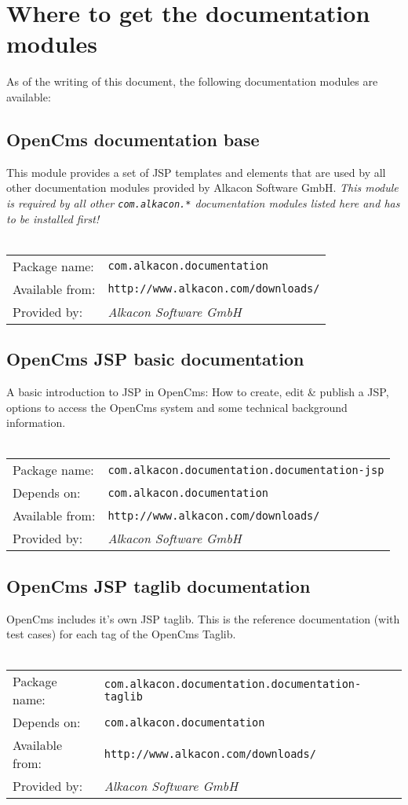 \section{Where to get the documentation modules}

As of the writing of this document, the following documentation modules are available:

\subsection{OpenCms documentation base}
This module provides a set of JSP templates and elements that are used by
all other documentation modules provided by Alkacon Software GmbH. {\em This module is required
by all other {\tt com.alkacon.*} documentation modules listed here and has to be installed first!}
\\
\\
\begin{tabular}{ll}
Package name: & {\tt com.alkacon.documentation}\\
Available from: & {\tt http://www.alkacon.com/downloads/}\\
Provided by: & {\em Alkacon Software GmbH}\\
\end{tabular}

\subsection{OpenCms JSP basic documentation}
A basic introduction to JSP in OpenCms: How to create, edit \& publish a JSP, options to access 
the OpenCms system and some technical background information.
\\
\\
\begin{tabular}{ll}
Package name: & {\tt com.alkacon.documentation.documentation-jsp}\\
Depends on: & {\tt com.alkacon.documentation}\\
Available from: & {\tt http://www.alkacon.com/downloads/}\\
Provided by: & {\em Alkacon Software GmbH}\\
\end{tabular}

\subsection{OpenCms JSP taglib documentation}
OpenCms includes it's own JSP taglib. This is the reference documentation (with test cases) for 
each tag of the OpenCms Taglib.
\\
\\
\begin{tabular}{ll}
Package name: & {\tt com.alkacon.documentation.documentation-taglib}\\
Depends on: & {\tt com.alkacon.documentation}\\
Available from: & {\tt http://www.alkacon.com/downloads/}\\
Provided by: & {\em Alkacon Software GmbH}\\
\end{tabular}

